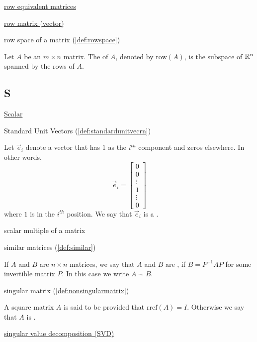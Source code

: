 \documentclass{ximera}
\begin{document}
\href{https://ximera.osu.edu/oerlinalg/LinearAlgebra/SYS-0020/main}{row equivalent matrices}

\href{https://ximera.osu.edu/oerlinalg/LinearAlgebra/MAT-0010/main}{row matrix (vector)}

row space of a matrix (\ref{def:rowspace})
\begin{expandable}
    Let $A$ be an $m\times n$ matrix.  The  of $A$, denoted by $\mbox{row}(A)$, is the subspace of $\mathbb{R}^n$ spanned by the rows of $A$.
\end{expandable}


\subsection{S}
\href{https://ximera.osu.edu/oerlinalg/LinearAlgebra/VEC-0010/main}{Scalar} 

Standard Unit Vectors (\ref{def:standardunitvecrn})
\begin{expandable}
  Let $\vec{e}_i$ denote a vector that has $1$ as the $i^{th}$ component and zeros elsewhere.  In other words, $$\vec{e}_i=\begin{bmatrix}
0\\
0\\
\vdots\\
1\\
\vdots\\
0
\end{bmatrix}$$ 
  where $1$ is in the $i^{th}$ position.  We say that  $\vec{e}_i$ is a .
\end{expandable}

scalar multiple of a matrix

similar matrices (\ref{def:similar})
\begin{expandable}
    If $A$ and $B$ are $n \times n$ matrices, we say that $A$ and $B$ are , if $B = P^{-1}AP$ for some invertible matrix $P$.  In this case we write $A \sim B$.
\end{expandable}

singular matrix (\ref{def:nonsingularmatrix})
\begin{expandable}
    A square matrix $A$ is said to be  provided that $\mbox{rref}(A)=I$.  Otherwise we say that $A$ is .
\end{expandable}

\href{https://ximera.osu.edu/oerlinalg/LinearAlgebra/RTH-0060/main}{singular value decomposition (SVD)}
\end{document}

